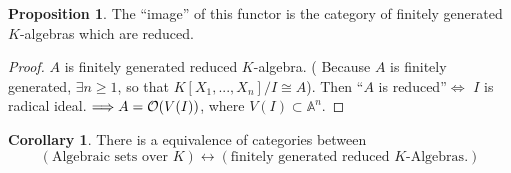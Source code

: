 \documentclass[11pt]{article}
\theoremstyle{definition}
\newtheorem{prop}[thm]{Proposition}
\newtheorem{cor}[thm]{Corollary}
\newcommand{\affn}{\mathbb A}
\newcommand{\calo}{{\cal O}}
\newcommand{\Lrta}{\Longrightarrow}
\newcommand{\llrta}{\longleftrightarrow}
\newcommand{\Llrta}{\Longleftrightarrow}
\begin{document}
\begin{prop} The ``image'' of this functor is the category of finitely generated $K$-algebras which are reduced.
\end{prop}
\begin{proof}
$A$ is  finitely generated reduced $K$-algebra. ( Because $A$ is finitely generated, $\exists n\geq 1$, so that $K[X_1,...,X_n]/I\cong A$). Then ``$A$ is reduced''$\Llrta$ $I$ is radical ideal.
$\Lrta A=\calo(V(I))$, where $V(I)\subset \affn^n$.
\end{proof}

\begin{cor}
There is a equivalence of categories between 
$$
(\text{Algebraic sets over $K$})\llrta (\text{finitely generated reduced } K\text{-Algebras}.)
$$
\end{cor}
\end{document}
